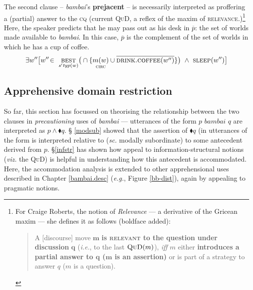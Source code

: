 	\a The second clause -- \textit{bambai}'s \textbf{prejacent} -- is necessarily interpreted as proffering a (partial) answer to the \textsc{cq} (current \textsc{QuD}, a reflex of the maxim of \textsc{relevance}.)\footnote{For Craige Roberts, the notion of \textit{Relevance} --- a derivative of the Gricean maxim --- she defines it as follows (boldface added):
	
\begin{quote}
	A [discourse] move $\boldsymbol m $ \textbf{is \textsc{relevant} to the question under discussion} $ \boldsymbol q $ (\textit{i.e.}, to the last $ \textsc{QuD}(m) $), \textit{iff} $ m $ either \textbf{introduces a partial answer to $ \boldsymbol q $ ($\boldsymbol m $ is an assertion)} or is part of a strategy to answer $ q $ ($ m $ is a question).
\end{quote}


\label{rob-rel}} Here, the speaker predicts that he may pass out as his desk in $ \overline{p} $: the set of worlds made available to \textit{bambai}. In this case, $ \overline p $ is the complement of the set of worlds in which he has a cup of coffee.
$$\exists w^{\prime\prime}\big[w''\!\in\ \underset{\mathit{s'typ}(w)}{\textsc{best}}\big(\cap\{ \underset{\textsc{circ}}{m(w)}\cup\overline{\textsc{drink.coffee}(w^{\prime\prime})}\}\big)\ \wedge\ \textsc{sleep}(w^{\prime\prime})\big]$$
	
	

	
\xe


\subsection{Apprehensive domain restriction}

So far, this section has focussed on theorising the relationship between the two clauses in \textit{precautioning} uses of \textit{bambai} --- utterances of the form $ p\textit{ bambai }q $ are interpreted as $ p\wedge\blacklozenge q $. § \ref{modsub} showed that the assertion of $ \blacklozenge q $ (in utterances of the form is interpreted relative to (\textit{sc.} modally subordinate) to some antecedent derived from $ p $. \S\thinspace\ref{infstr} has shown how appeal to information-structural notions (\textit{viz.} the \textsc{QuD}) is helpful in understanding how this antecedent is accommodated. Here, the accommodation analysis is extended to other apprehensional uses described in Chapter \ref{bambai.desc} (\textit{e.g.}, Figure \ref{bb-dist}), again by appealing to pragmatic notions.


